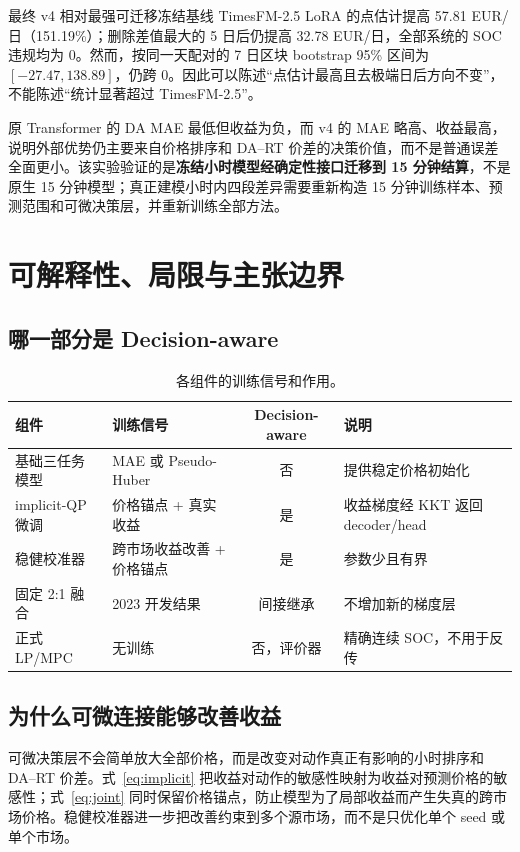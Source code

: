 \documentclass[UTF8,a4paper,11pt,fontset=fandol]{ctexart}
\begin{document}
最终 v4 相对最强可迁移冻结基线 TimesFM-2.5 LoRA 的点估计提高 57.81 EUR/日（151.19\%）；删除差值最大的 5 日后仍提高 32.78 EUR/日，全部系统的 SOC 违规均为 0。然而，按同一天配对的 7 日区块 bootstrap 95\% 区间为 $[-27.47,138.89]$，仍跨 0。因此可以陈述“点估计最高且去极端日后方向不变”，不能陈述“统计显著超过 TimesFM-2.5”。

原 Transformer 的 DA MAE 最低但收益为负，而 v4 的 MAE 略高、收益最高，说明外部优势仍主要来自价格排序和 DA--RT 价差的决策价值，而不是普通误差全面更小。该实验验证的是\textbf{冻结小时模型经确定性接口迁移到 15 分钟结算}，不是原生 15 分钟模型；真正建模小时内四段差异需要重新构造 15 分钟训练样本、预测范围和可微决策层，并重新训练全部方法。

\section{可解释性、局限与主张边界}

\subsection{哪一部分是 Decision-aware}

\begin{table}[H]
\centering
\caption{各组件的训练信号和作用。}
\label{tab:decision-aware}
\footnotesize
\begin{tabularx}{\textwidth}{l l c Y}
\toprule
组件 & 训练信号 & Decision-aware & 说明 \\
\midrule
基础三任务模型 & MAE 或 Pseudo-Huber & 否 & 提供稳定价格初始化 \\
implicit-QP 微调 & 价格锚点 + 真实收益 & 是 & 收益梯度经 KKT 返回 decoder/head \\
稳健校准器 & 跨市场收益改善 + 价格锚点 & 是 & 参数少且有界 \\
固定 2:1 融合 & 2023 开发结果 & 间接继承 & 不增加新的梯度层 \\
正式 LP/MPC & 无训练 & 否，评价器 & 精确连续 SOC，不用于反传 \\
\bottomrule
\end{tabularx}
\end{table}

\subsection{为什么可微连接能够改善收益}

可微决策层不会简单放大全部价格，而是改变对动作真正有影响的小时排序和 DA--RT 价差。式~\eqref{eq:implicit} 把收益对动作的敏感性映射为收益对预测价格的敏感性；式~\eqref{eq:joint} 同时保留价格锚点，防止模型为了局部收益而产生失真的跨市场价格。稳健校准器进一步把改善约束到多个源市场，而不是只优化单个 seed 或单个市场。
\end{document}
